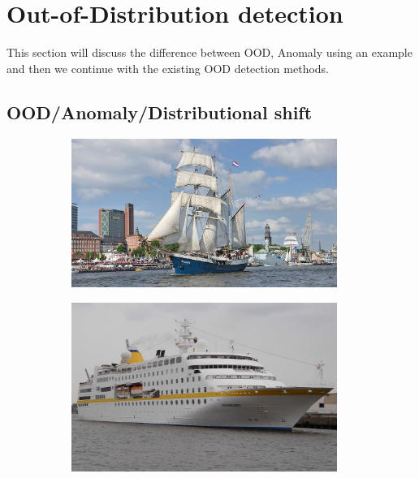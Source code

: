     
    
    \section{Out-of-Distribution detection}
    This section will discuss the difference between OOD, Anomaly using an example and then we continue with the existing OOD detection methods.

    \subsection{OOD/Anomaly/Distributional shift}
\label{sec:oodvanom}
\begin{figure}[h!]
    \begin{subfigure}{0.333\textwidth}
        \centering
        \includegraphics[height=0.15\textheight,width=0.95\textwidth]{images/intro_ood_anomaly/old_ship.jpg}
        \caption{}
        \label{fig:old_ship}
    \end{subfigure}
    \begin{subfigure}{0.333\textwidth}
        \centering
        \includegraphics[height=0.15\textheight,width=0.95\textwidth]{images/intro_ood_anomaly/Trainer_cruiser.jpeg}

\end{subfigure}
\end{figure}
